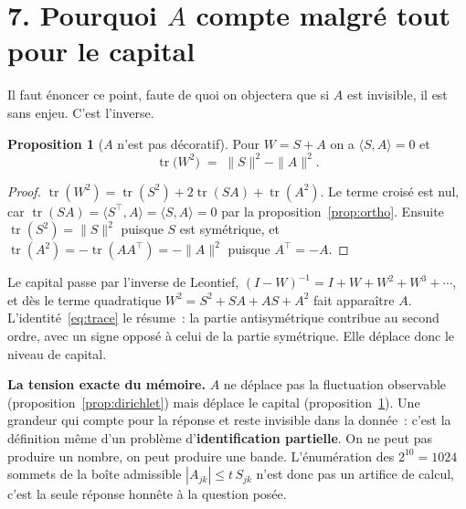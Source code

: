 \documentclass[11pt,a4paper]{article}
\theoremstyle{definition}
\newtheorem{proposition}{Proposition}
\newcommand{\T}{^{\top}}
\begin{document}
\section*{7. Pourquoi $A$ compte malgré tout pour le capital}

Il faut énoncer ce point, faute de quoi on objectera que si $A$ est invisible, il est sans
enjeu. C'est l'inverse.

\begin{proposition}[$A$ n'est pas décoratif]\label{prop:trace}
Pour $W=S+A$ on a $\langle S,A\rangle=0$ et
\begin{equation}
  \operatorname{tr}\!\bigl(W^2\bigr)\;=\;\|S\|^2-\|A\|^2 .
  \label{eq:trace}
\end{equation}
\end{proposition}

\begin{proof}
$\operatorname{tr}(W^2)=\operatorname{tr}(S^2)+2\operatorname{tr}(SA)+
\operatorname{tr}(A^2)$. Le terme croisé est nul, car
$\operatorname{tr}(SA)=\langle S\T,A\rangle=\langle S,A\rangle=0$ par la
proposition~\ref{prop:ortho}. Ensuite $\operatorname{tr}(S^2)=\|S\|^2$ puisque $S$ est
symétrique, et $\operatorname{tr}(A^2)=-\operatorname{tr}(AA\T)=-\|A\|^2$ puisque
$A\T=-A$.
\end{proof}

Le capital passe par l'inverse de Leontief,
$(I-W)^{-1}=I+W+W^2+W^3+\cdots$, et dès le terme quadratique
$W^2=S^2+SA+AS+A^2$ fait apparaître $A$. L'identité~\eqref{eq:trace} le résume~: la partie
antisymétrique contribue au second ordre, avec un signe opposé à celui de la partie
symétrique. Elle déplace donc le niveau de capital.

\begin{cle}
\textbf{La tension exacte du mémoire.} $A$ ne déplace pas la fluctuation observable
(proposition~\ref{prop:dirichlet}) mais déplace le capital (proposition~\ref{prop:trace}).
Une grandeur qui compte pour la réponse et reste invisible dans la donnée~: c'est la
définition même d'un problème d'\textbf{identification partielle}. On ne peut pas produire
un nombre, on peut produire une bande. L'énumération des $2^{10}=1024$ sommets de la boîte
admissible $|A_{jk}|\le t\,S_{jk}$ n'est donc pas un artifice de calcul, c'est la seule
réponse honnête à la question posée.
\end{cle}

\end{document}
